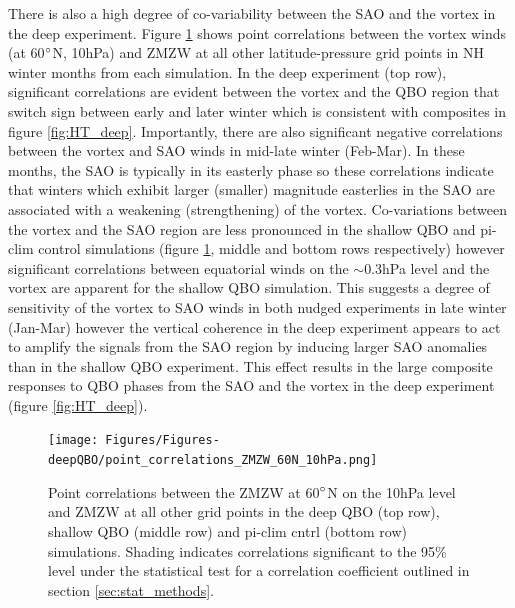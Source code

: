 There is also a high degree of co-variability between the SAO and the vortex in the deep experiment. Figure \ref{fig:point_cors} shows point correlations between the vortex winds (at 60$\degree$N, 10hPa) and ZMZW at all other latitude-pressure grid points in NH winter months from each simulation. In the deep experiment (top row), significant correlations are evident between the vortex and the QBO region that switch sign between early and later winter which is consistent with composites in figure \ref{fig:HT_deep}. Importantly, there are also significant negative correlations between the vortex and SAO winds in mid-late winter (Feb-Mar). In these months, the SAO is typically in its easterly phase so these correlations indicate that winters which exhibit larger (smaller) magnitude easterlies in the SAO are associated with a weakening (strengthening) of the vortex. Co-variations between the vortex and the SAO region are less pronounced in the shallow QBO and pi-clim control simulations (figure \ref{fig:point_cors}, middle and bottom rows respectively) however significant correlations between equatorial winds on the $\sim$0.3hPa level and the vortex are apparent for the shallow QBO simulation. This suggests a degree of sensitivity of the vortex to SAO winds in both nudged experiments in late winter (Jan-Mar) however the vertical coherence in the deep experiment appears to act to amplify the signals from the SAO region by inducing larger SAO anomalies than in the shallow QBO experiment. This effect results in the large composite responses to QBO phases from the SAO and the vortex in the deep experiment (figure \ref{fig:HT_deep}).

\begin{figure}[h!]
\begin{center}
\noindent\texttt{[image: Figures/Figures-deepQBO/point\_correlations\_ZMZW\_60N\_10hPa.png]}
\caption[Point correlations between vortex ZMZWs and winds at other points in QBO experiments]{Point correlations between the ZMZW at 60$\degree$N on the 10hPa level and ZMZW at all other grid points in the deep QBO (top row), shallow QBO (middle row) and pi-clim cntrl (bottom row) simulations. Shading indicates correlations significant to the 95\% level under the statistical test for a correlation coefficient outlined in section \ref{sec:stat_methods}.}
\label{fig:point_cors}
\end{center}
\end{figure}

